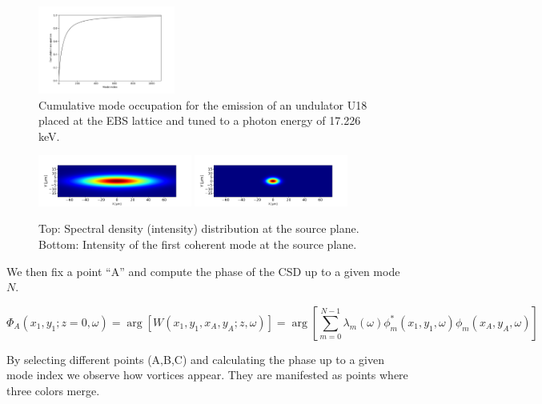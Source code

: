 \documentclass[a4paper,10pt]{article}
\begin{document}
\begin{figure}\label{cumulative_mode_occupation}
\caption{Cumulative mode occupation for the emission of an undulator U18 placed at the EBS lattice and tuned to a photon energy of 17.226 keV.}
\includegraphics[width=0.4\textwidth]{Figures/vx_cumulated.png}
\end{figure}

\begin{figure}\label{spectral_density}%
\caption{Top: Spectral density (intensity) distribution at the source plane. Bottom: Intensity of the first coherent mode at the source plane.}
\includegraphics[width=0.45\textwidth]{Figures/spectral_density_upto1099.png}
\includegraphics[width=0.45\textwidth]{Figures/spectral_density_upto0.png}
\end{figure}

We then fix a point ``A'' and compute the phase of the CSD up to a given mode $N$. 

\begin{equation}\label{phase_of_W}
\Phi_A(x_1,y_1;z=0,\omega)=\arg[W(x_1,y_1,x_A,y_A;z,\omega)]=\arg[
\sum_{m=0}^{N-1} \lambda_m(\omega)
\phi_m^*(x_1,y_1,\omega)
\phi_m(x_A,y_A, \omega)]
\end{equation}

By selecting different points (A,B,C) and calculating the phase up to a given mode index we observe how vortices appear. They are manifested as points where three colors merge. 
\end{document}
